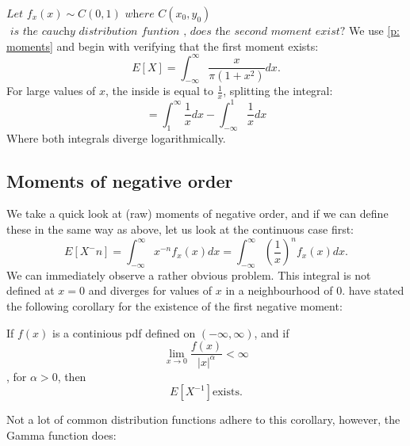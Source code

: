 \begin{example}
   \( \textit{Let }  f_x(x) \sim C(0, 1) \textit{ where } C(x_0, y_0)\)
   \newline
    \(\textit{ is the cauchy distribution funtion , does the second moment exist?}\)
    \newline
    We use \ref{p: moments} and begin with verifying that the first moment exists:
    \[ E[X] = \int_{-\infty}^{\infty} \frac{x}{\pi(1 + x^2)} dx.\] For large values of \(x\), the inside is equal to \(\frac{1}{x}\), splitting the integral:
    \[ =  \int_{1}^{\infty} \frac{1}{x} dx - \int_{-\infty}^{1} \frac{1}{x} dx\] Where both integrals diverge logarithmically.
\end{example}

\subsection{Moments of negative order}
We take a quick look at (raw) moments of negative order, and if we can define these in the same way as above, let us look at the continuous case first:
\[E[X^-n] = \int_{-\infty}^{\infty} x^{-n} f_x(x) dx = \int_{-\infty}^{\infty} (\frac{1}{x})^n f_x(x) dx.\] We can immediately observe a rather obvious problem. This integral is not defined at \(x = 0\) and diverges for values of \(x\) in a neighbourhood of \(0\). \cite{khuri2002} have stated the following corollary for the existence of the first negative moment:
\begin{corollary}
    If \(f(x)\) is a continious pdf defined on \((-\infty, \infty)\), and if \[\lim_{x \to 0} \frac{f(x)}{|x|^\alpha} < \infty\], for \(\alpha > 0\), then \[E[X^{-1}] \text{exists}.\]
\end{corollary}

Not a lot of common distribution functions adhere to this corollary, however, the Gamma function does:

